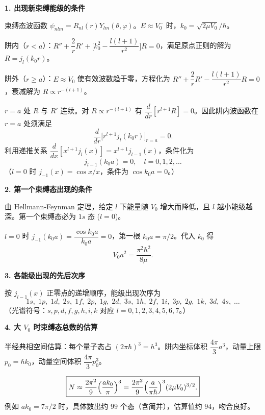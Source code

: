 \begin{derivationbox}[标准解题过程]
\textbf{1. 出现新束缚能级的条件}

束缚态波函数 $\psi_{nlm}=R_{nl}(r)Y_{lm}(\theta,\varphi)$。$E\approx V_0^-$ 时，$k_0=\sqrt{2\mu V_0}/\hbar$。

阱内（$r<a$）：$R''+\dfrac{2}{r}R'+\bigl[k_0^2-\dfrac{l(l+1)}{r^2}\bigr]R=0$，满足原点正则的解为 $R=j_l(k_0r)$。

阱外（$r\ge a$）：$E\approx V_0$ 使有效波数趋于零，方程化为 $R''+\dfrac{2}{r}R'-\dfrac{l(l+1)}{r^2}R=0$，衰减解为 $R\propto r^{-(l+1)}$。

$r=a$ 处 $R$ 与 $R'$ 连续。对 $R\propto r^{-(l+1)}$ 有 $\dfrac{d}{dr}[r^{l+1}R]=0$。因此阱内波函数在 $r=a$ 处须满足
\[
\frac{d}{dr}\bigl[r^{l+1}j_l(k_0r)\bigr]_{r=a}=0.
\]
利用递推关系 $\dfrac{d}{dx}[x^{l+1}j_l(x)]=x^{l+1}j_{l-1}(x)$，条件化为
\begin{equation}
\boxed{j_{l-1}(k_0a)=0,\quad l=0,1,2,\ldots}
\end{equation}
（$l=0$ 时 $j_{-1}(x)=\cos x/x$，条件为 $\cos k_0a=0$。）

\textbf{2. 第一个束缚态出现的条件}

由 Hellmann-Feynman 定理，给定 $l$ 下能量随 $V_0$ 增大而降低，且 $l$ 越小能级越深。第一个束缚态必为 $1s$ 态 ($l=0$)。

$l=0$ 时 $j_{-1}(k_0a)=\dfrac{\cos k_0a}{k_0a}=0$，第一根 $k_0a=\pi/2$。代入 $k_0$ 得
\begin{equation}
\boxed{V_0a^2=\frac{\pi^2\hbar^2}{8\mu}.}
\end{equation}

\textbf{3. 各能级出现的先后次序}

按 $j_{l-1}(x)$ 正零点的递增顺序，能级出现次序为
\begin{equation}
\boxed{1s,\;1p,\;1d,\;2s,\;1f,\;2p,\;1g,\;2d,\;3s,\;1h,\;2f,\;1i,\;3p,\;2g,\;1k,\;3d,\;4s,\;\ldots}
\end{equation}
（光谱符号：$s,p,d,f,g,h,i,k$ 对应 $l=0,1,2,3,4,5,6,7$。）

\textbf{4. 大 $V_0$ 时束缚态总数的估算}

半经典相空间估算：每个量子态占 $(2\pi\hbar)^3=h^3$。阱内坐标体积 $\dfrac{4\pi}{3}a^3$，动量上限 $p_0=\hbar k_0$，动量空间体积 $\dfrac{4\pi}{3}p_0^3$。

\begin{equation}
\boxed{N\approx\frac{2\pi^2}{9}\Bigl(\frac{ak_0}{\pi}\Bigr)^3=\frac{2\pi^2}{9}\Bigl(\frac{a}{\pi\hbar}\Bigr)^3(2\mu V_0)^{3/2}.}
\end{equation}
例如 $ak_0=7\pi/2$ 时，具体数出约 $99$ 个态（含简并），估算值约 $94$，吻合良好。
\end{derivationbox}

